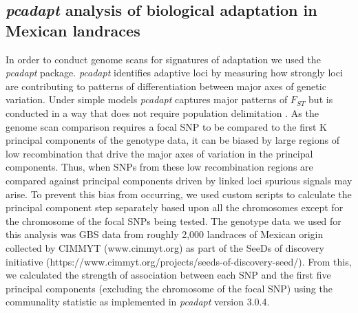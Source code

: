 \documentclass[9pt,twocolumn,twoside,lineno]{biorxiv}
\begin{document}
\subsection{\textit{pcadapt} analysis of biological adaptation in Mexican landraces}
In order to conduct genome scans for signatures of adaptation we used the \textit{pcadapt} \cite{Luu2017-ws} package.
\textit{pcadapt} identifies adaptive loci by measuring how strongly loci are contributing to patterns of differentiation between major axes of genetic variation.
Under simple models \textit{pcadapt} captures major patterns of $F_{ST}$  but is conducted in a way that does not require population delimitation \cite{duforet2014genome}.
As the genome scan comparison requires a focal SNP to be compared to the first K principal components of the genotype data, it can be biased by large regions of low recombination that drive the major axes of variation in the principal components.
Thus, when SNPs from these low recombination regions are compared against principal components driven by linked loci spurious signals may arise.
To prevent this bias from occurring, we used custom scripts to calculate the principal component step separately based upon all the chromosomes except for the chromosome of the focal SNPs being tested.
The genotype data we used for this analysis was GBS data from roughly 2,000 landraces of Mexican origin collected by CIMMYT (www.cimmyt.org) as part of the SeeDs of discovery initiative (https://www.cimmyt.org/projects/seeds-of-discovery-seed/).
From this, we calculated the strength of association between each SNP and the first five principal components (excluding the chromosome of the focal SNP) using the communality statistic as implemented in \textit{pcadapt} version 3.0.4.
\end{document}
